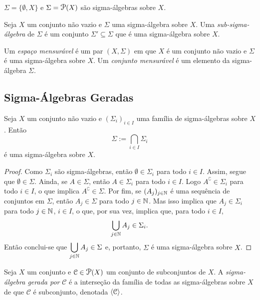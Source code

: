 \begin{ex}
	$\Sigma = \{\emptyset,X\}$ e $\Sigma = \p(X)$ são sigma-álgebras sobre $X$.
\end{ex}

\begin{defi}
Seja $X$ um conjunto não vazio e $\Sigma$ uma sigma-álgebra sobre $X$. Uma \emph{sub-sigma-álgebra} de $\Sigma$ é um conjunto $\Sigma' \subseteq \Sigma$ que é uma sigma-álgebra sobre $X$.
\end{defi}

\begin{defi}
	Um \emph{espaço mensurável} é um par $(X,\Sigma)$ em que $X$ é um conjunto não vazio e $\Sigma$ é uma sigma-álgebra sobre $X$. Um \emph{conjunto mensurável} é um elemento da sigma-álgebra $\Sigma$.
\end{defi}

\subsection{Sigma-Álgebras Geradas}

\begin{prop}
Seja $X$ um conjunto não vazio e $(\Sigma_i)_{i \in I}$ uma família de sigma-álgebras sobre $X$. Então
	\begin{equation*}
	\Sigma := \bigcap_{i \in I} \Sigma_i
	\end{equation*}
é uma sigma-álgebra sobre $X$.
\end{prop}
\begin{proof}
	Como $\Sigma_i$ são sigma-álgebras, então $\emptyset \in \Sigma_i$ para todo $i \in I$. Assim, segue que $\emptyset \in \Sigma$. Ainda, se $A \in \Sigma$, então $A \in \Sigma_i$ para todo $i \in I$. Logo $A^\complement \in \Sigma_i$ para todo $i \in I$, o que implica $A^\complement \in \Sigma$. Por fim, se $(A_j)_{j \in \mathbb{N}}$ é uma sequência de conjuntos em $\Sigma$, então $A_j \in \Sigma$ para todo $j \in \mathbb{N}$. Mas isso implica que $A_j \in \Sigma_i$ para todo $j \in \mathbb{N}$, $i \in I$, o que, por sua vez, implica que, para todo $i \in I$,
	\begin{equation*}
	\bigcup_{j \in \mathbb{N}} A_j \in \Sigma_i.
	\end{equation*}
Então conclui-se que $\displaystyle\bigcup_{j \in \mathbb{N}} A_j \in \Sigma$ e, portanto, $\Sigma$ é uma sigma-álgebra sobre $X$.
\end{proof}

\begin{defi}
Seja $X$ um conjunto e $\mathcal C \in \p(X)$ um conjunto de subconjuntos de $X$. A \emph{sigma-álgebra gerada por} $\mathcal C$ é a interseção da família de todas as sigma-álgebras sobre $X$ de que $\mathcal C$ é subconjunto, denotada $\left\langle \mathcal C \right\rangle$.
\end{defi}
	
